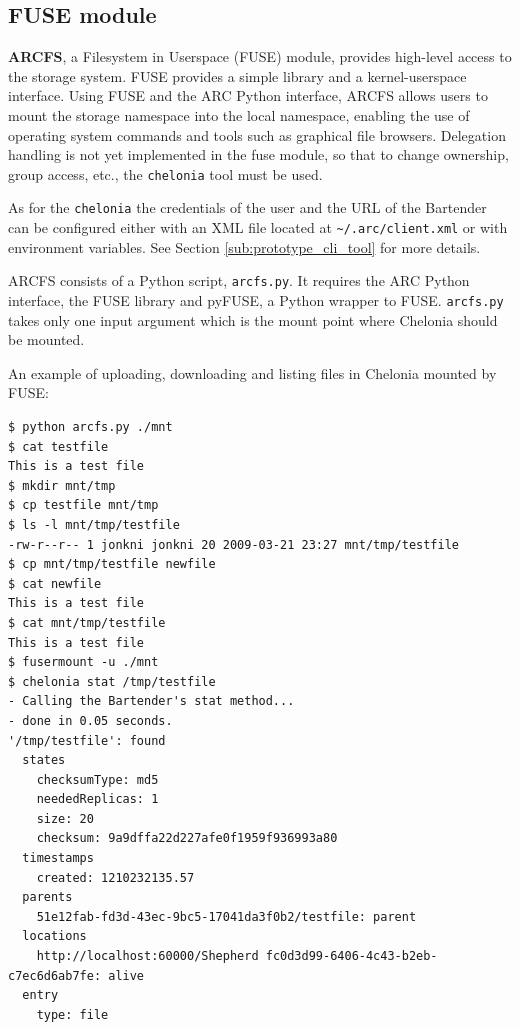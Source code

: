 \documentclass{book}
\begin{document}

\subsection{FUSE module} %
\label{sub:fuse_module}

\textbf{ARCFS}, a Filesystem in Userspace (FUSE) module, provides high-level access to the storage system. FUSE provides a simple library and a kernel-userspace interface. Using FUSE and the ARC Python interface, ARCFS allows users to mount the storage namespace into the local namespace, enabling the use of operating system commands and tools such as graphical file browsers. Delegation handling is not yet implemented in the fuse module, so that to change ownership, group access, etc., the \verb!chelonia! tool must be used.

As for the \verb!chelonia! the credentials of the user and the URL of the Bartender can be configured either with an XML file located at \verb!~/.arc/client.xml! or with environment variables. See Section \ref{sub:prototype_cli_tool} for more details.

ARCFS consists of a Python script, \verb!arcfs.py!. It requires the ARC Python interface, the FUSE library and pyFUSE, a Python wrapper to FUSE. \verb!arcfs.py! takes only one input argument which is the mount point where Chelonia should be mounted.

An example of uploading, downloading and listing files in Chelonia mounted by FUSE:

\begin{verbatim}
$ python arcfs.py ./mnt
$ cat testfile
This is a test file
$ mkdir mnt/tmp
$ cp testfile mnt/tmp
$ ls -l mnt/tmp/testfile
-rw-r--r-- 1 jonkni jonkni 20 2009-03-21 23:27 mnt/tmp/testfile
$ cp mnt/tmp/testfile newfile
$ cat newfile
This is a test file
$ cat mnt/tmp/testfile
This is a test file
$ fusermount -u ./mnt
$ chelonia stat /tmp/testfile
- Calling the Bartender's stat method...
- done in 0.05 seconds.
'/tmp/testfile': found
  states
    checksumType: md5
    neededReplicas: 1
    size: 20
    checksum: 9a9dffa22d227afe0f1959f936993a80
  timestamps
    created: 1210232135.57
  parents
    51e12fab-fd3d-43ec-9bc5-17041da3f0b2/testfile: parent
  locations
    http://localhost:60000/Shepherd fc0d3d99-6406-4c43-b2eb-c7ec6d6ab7fe: alive
  entry
    type: file
\end{verbatim}

\end{document}
